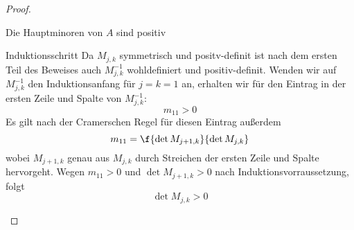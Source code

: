 \documentclass{mycourse}
\begin{document}
\begin{st}
\begin{proof}
\begin{enumerate}
\begin{seg}{Die Hauptminoren von $A$ sind positiv}
\begin{seg}{Induktionsschritt}
					Da $M_{j,k}$ symmetrisch und positv-definit ist nach dem ersten Teil des Beweises auch $M_{j,k}^{-1}$ wohldefiniert und positiv-definit.
					Wenden wir auf $M_{j,k}^{-1}$ den Induktionsanfang für $j=k=1$ an, erhalten wir für den Eintrag in der ersten Zeile und Spalte von $M_{j,k}^{-1}$:
					\[
						m_{11} > 0
					\]
					Es gilt nach der Cramerschen Regel für diesen Eintrag außerdem
					\[
						m_{11} = \f {\det M_{j+1,k}}{\det M_{j,k}}
					\]
					wobei $M_{j+1,k}$ genau aus $M_{j,k}$ durch Streichen der ersten Zeile und Spalte hervorgeht.
					Wegen $m_{11}>0$ und $\det M_{j+1,k} > 0$ nach Induktionsvorraussetzung, folgt
					\[
						\det M_{j,k} > 0
					\]
				\end{seg}
			\end{seg}
		\end{enumerate}
	\end{proof}
\end{st}
\end{document}
